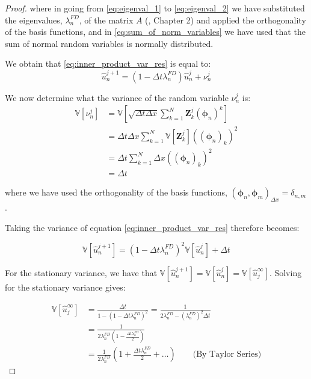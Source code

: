 \begin{proof}
where in going from \eqref{eq:eigenval_1} to \eqref{eq:eigenval_2}
we have substituted the eigenvalues, $\lambda_n^{FD}$, of the matrix 
$A$ (\cite{strang2007computational}, Chapter 2) and applied the orthogonality
of the basis functions, and in 
\eqref{eq:sum_of_norm_variables} we have 
used that the sum of normal random variables is normally 
distributed.

We obtain that \eqref{eq:inner_product_var_res} is equal to:
\begin{equation}
    \hat{u}_n^{j+1} = (1 - \Delta t \lambda_n^{FD}) \hat{u}_n^j + 
    \nu_n^j
\end{equation}

We now determine what the variance of the random variable 
$\nu_n^j$ is:
\begin{align*}
    \mathbb{V}[\nu_n^j] &= \mathbb{V}\left[\sqrt{\Delta t \Delta x}
    \sum_{k=1}^N\mathbf{Z}_k^j(\boldsymbol{\phi}_n)^k\right] \\
    &=\Delta t \Delta x \sum_{k=1}^N \mathbb{V}[\mathbf{Z}_k^j]
    ((\boldsymbol{\phi}_n)_k)^2 \\
    &= \Delta t \sum_{k=1}^N \Delta x  ((\boldsymbol{\phi}_n)_k)^2\\
    &= \Delta t
\end{align*}

where we have used the orthogonality of the basis functions, 
$(\boldsymbol{\phi}_n, \boldsymbol{\phi}_m)_{\Delta x} = 
\delta_{n,m}$.

Taking the variance of equation 
\eqref{eq:inner_product_var_res} therefore becomes:

\begin{equation}\label{eq:var_of_relation}
    \mathbb{V}[\hat{u}_n^{j+1}] = (1-\Delta t \lambda_n^{FD})^2
    \mathbb{V}[\hat{u}_n^j] + \Delta t
\end{equation}

For the stationary variance, we have that 
$\mathbb{V}[\hat{u}_n^{j+1}] = 
\mathbb{V}[\hat{u}_n^{j}] = 
\mathbb{V}[\hat{u}_j^\infty]$. Solving for the stationary 
variance gives:

\begin{align}
\mathbb{V}[\hat{u}_j^\infty] 
&= \frac{\Delta t}{1 - 
(1-\Delta t \lambda_n^{FD})^2} = 
\frac{1}{2\lambda_n^{FD} - 
(\lambda_n^{FD})^2 \Delta t}
\label{eq:fourier_variance_stationary}
\\
&= \frac{1}{2\lambda_n^{FD}(1 - \frac{\Delta t \lambda_n^{FD}}{2})}\\
&= \frac{1}{2\lambda_n^{FD}}(1 + \frac{\Delta t \lambda_n^{FD}}{2}
+ \dots)\label{eq:using_taylor_series} \qquad 
\text{(By Taylor Series)}
\end{align}


\end{proof}

